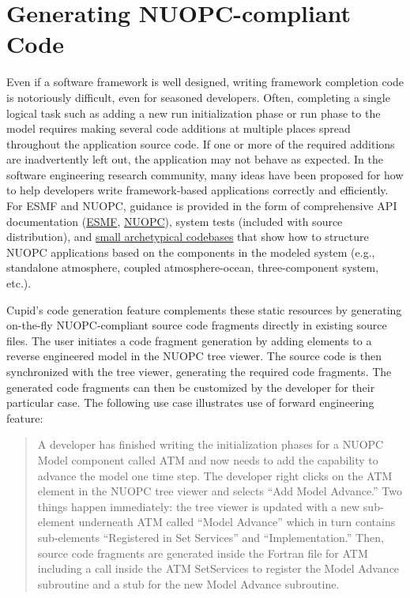 \documentclass[oneside,11pt]{memoir}
\begin{document}
\chapter{Generating NUOPC-compliant Code}

Even if a software framework is well designed, writing framework completion code is notoriously difficult, even for seasoned developers. Often, completing a single logical task such as adding a new run initialization phase or run phase to the model requires making several code additions at multiple places spread throughout the application source code. If one or more of the required additions are inadvertently left out, the application may not behave as expected.  
In the software engineering research community, many ideas have been proposed for how to help developers write framework-based applications correctly and efficiently. For ESMF and NUOPC, guidance is provided in the form of comprehensive API documentation (\href{http://www.earthsystemmodeling.org/esmf_releases/public/last/ESMF_refdoc/}{ESMF}, \href{https://earthsystemcog.org/projects/nuopc/refmans}{NUOPC}), system tests (included with source distribution), and \href{https://earthsystemcog.org/projects/nuopc/proto_codes}{small archetypical codebases} that show how to structure NUOPC applications based on the components in the modeled system (e.g., standalone atmosphere, coupled atmosphere-ocean, three-component system, etc.). 

Cupid's code generation feature complements these static resources by generating on-the-fly NUOPC-compliant source code fragments directly in existing source files. The user initiates a code fragment generation by adding elements to a reverse engineered model in the NUOPC tree viewer. The source code is then synchronized with the tree viewer, generating the required code fragments. The generated code fragments can then be customized by the developer for their particular case. The following use case illustrates use of forward engineering feature:

\begin{quote}
A developer has finished writing the initialization phases for a NUOPC Model component called ATM and now needs to add the capability to advance the model one time step. The developer right clicks on the ATM element in the NUOPC tree viewer and selects ``Add Model Advance.''  Two things happen immediately: the tree viewer is updated with a new sub-element underneath ATM called ``Model Advance'' which in turn contains sub-elements ``Registered in Set Services'' and ``Implementation.'' Then, source code fragments are generated inside the Fortran file for ATM including a call inside the ATM SetServices to register the Model Advance subroutine and a stub for the new Model Advance subroutine.
\end{quote}
\end{document}
